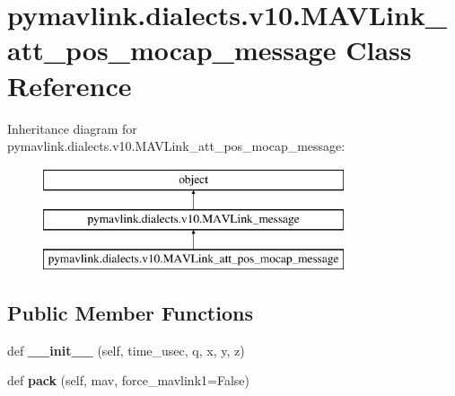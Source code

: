 \hypertarget{classpymavlink_1_1dialects_1_1v10_1_1MAVLink__att__pos__mocap__message}{}\section{pymavlink.\+dialects.\+v10.\+M\+A\+V\+Link\+\_\+att\+\_\+pos\+\_\+mocap\+\_\+message Class Reference}
\label{classpymavlink_1_1dialects_1_1v10_1_1MAVLink__att__pos__mocap__message}
Inheritance diagram for pymavlink.\+dialects.\+v10.\+M\+A\+V\+Link\+\_\+att\+\_\+pos\+\_\+mocap\+\_\+message\+:\begin{figure}[H]
\begin{center}
\leavevmode
\includegraphics[height=3.000000cm]{classpymavlink_1_1dialects_1_1v10_1_1MAVLink__att__pos__mocap__message}
\end{center}
\end{figure}
\subsection*{Public Member Functions}
\begin{DoxyCompactItemize}
\item 
\mbox{\label{classpymavlink_1_1dialects_1_1v10_1_1MAVLink__att__pos__mocap__message_a5e7b8f94de1dcbdee43d7139dd40bc1f}} 
def {\bfseries \+\_\+\+\_\+init\+\_\+\+\_\+} (self, time\+\_\+usec, q, x, y, z)
\item 
\mbox{\label{classpymavlink_1_1dialects_1_1v10_1_1MAVLink__att__pos__mocap__message_a356579b1e5468638065775f506c76a55}} 
def {\bfseries pack} (self, mav, force\+\_\+mavlink1=False)
\end{DoxyCompactItemize}
